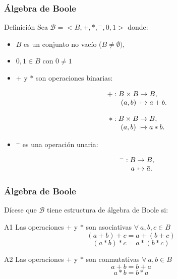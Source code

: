 \documentclass{beamer}
\begin{document}
\begin{frame}
\frametitle{\'Algebra de Boole}
\begin{block}{Definici\'on}
Sea $\mathcal{B} = <B,+,*,{}^-,0,1>$ donde:

\begin{itemize}
\item $B$ es un conjunto no vac\'io ($B\neq \emptyset)$,
\item $0,1\in B$ con $0\neq 1$
\item $+$ y $*$ son operaciones binarias:
\begin{multicols}{2} 

  \[
  \begin{array}{@{}r@{\;}c@{\;}c@{\;}l@{}}
    +: & B\times B & \rightarrow & B,   \\
       & (a,b) & \mapsto     & a+b.
  \end{array}
\]

  \[
  \begin{array}{@{}r@{\;}c@{\;}c@{\;}l@{}}
    *: & B\times B & \rightarrow & B,   \\
       & (a,b) & \mapsto     & a*b.
  \end{array}
\]
\end{multicols}
\item ${}^-$ es una operaci\'on unaria:

  \[
  \begin{array}{@{}r@{\;}c@{\;}c@{\;}l@{}}
    {}^-: & B & \rightarrow & B,   \\
       & a & \mapsto     & \bar{a}.
  \end{array}
\]
\end{itemize}
\end{block}
\end{frame}



\begin{frame}
\frametitle{\'Algebra de Boole}
D\'icese que $\mathcal{B}$ tiene estructura de \'algebra de Boole si:

\begin{block}{A1}
Las operaciones $+$ y $*$ son asociativas $\forall\ a,b,c\in B$
\[(a+b)+c = a+(b+c)\]
\[(a*b)*c = a*(b*c)\]
\end{block}


\begin{block}{A2}
Las operaciones $+$ y $*$ son conmutativas $\forall\ a,b\in B$
\[a+b = b+a\]
\[a*b = b*a\]
\end{block}
\end{frame}
\end{document}
